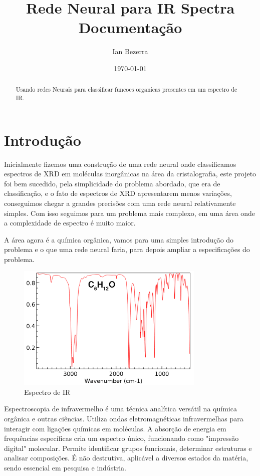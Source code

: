 \documentclass[11pt,a4paper]{article}
\title{Rede Neural para IR Spectra Documentação}
\author{Ian Bezerra}
\date{\today}
\begin{document}
\maketitle

\begin{abstract}
    Usando redes Neurais para classificar funcoes organicas presentes em um espectro de IR.
\end{abstract}

\section{Introdução}
Inicialmente fizemos uma construção de uma rede neural onde classificamos espectros de XRD em moléculas inorgânicas na área da cristalografia, este projeto foi bem sucedido, pela simplicidade do problema abordado, que era de classificação, e o fato de espectros de XRD apresentarem menos variações, conseguimos chegar a grandes precisões com uma rede neural relativamente simples. Com isso seguimos para um problema mais complexo, em uma área onde a complexidade de espectro é muito maior.

A área agora é a química orgânica, vamos para uma simples introdução do problema e o que uma rede neural faria, para depois ampliar a especificações do problema.

\begin{figure}[h]
    \centering
    \includegraphics[width=0.8\textwidth]{Images/spec.png}
    \caption{Espectro de IR}
    \label{fig:ir_spectrum}
\end{figure}

Espectroscopia de infravermelho é uma técnica analítica versátil na química orgânica e outras ciências. Utiliza ondas eletromagnéticas infravermelhas para interagir com ligações químicas em moléculas. A absorção de energia em frequências específicas cria um espectro único, funcionando como "impressão digital" molecular. Permite identificar grupos funcionais, determinar estruturas e analisar composições. É não destrutiva, aplicável a diversos estados da matéria, sendo essencial em pesquisa e indústria.
\end{document}
